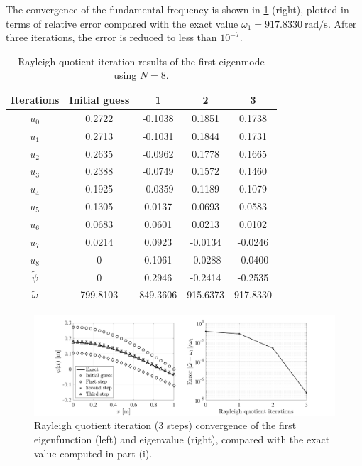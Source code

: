 \begin{enumerate}[(i)]
{    The convergence of the fundamental frequency is shown in \cref{fig:hw3_p5_results} (right), plotted in terms of relative error compared with the exact value $\omega_1 = \qty{917.8330}{\radian\per\second}$. 
    After three iterations, the error is reduced to less than $10^{-7}$.
    \begin{table}[!ht]
        \centering
        \begin{tabular}{|c|c|c|c|c|}
            \hline
            Iterations & Initial guess & 1 & 2 & 3 \\ \hline
            $u_0$ & 0.2722 & -0.1038 &  0.1851 &  0.1738 \\ \hline
            $u_1$ & 0.2713 & -0.1031 &  0.1844 &  0.1731 \\ \hline
            $u_2$ & 0.2635 & -0.0962 &  0.1778 &  0.1665 \\ \hline
            $u_3$ & 0.2388 & -0.0749 &  0.1572 &  0.1460 \\ \hline
            $u_4$ & 0.1925 & -0.0359 &  0.1189 &  0.1079 \\ \hline
            $u_5$ & 0.1305 &  0.0137 &  0.0693 &  0.0583 \\ \hline
            $u_6$ & 0.0683 &  0.0601 &  0.0213 &  0.0102 \\ \hline
            $u_7$ & 0.0214 &  0.0923 & -0.0134 & -0.0246 \\ \hline
            $u_8$ & 0      &  0.1061 & -0.0288 & -0.0400 \\ \hline
            $\tilde{\psi}$ &      0  &  0.2946 & -0.2414 & -0.2535 \\ \hline
            $\tilde{\omega}$ & 799.8103 & 849.3606 & 915.6373 & 917.8330
            \\ \hline
        \end{tabular}
        \caption{Rayleigh quotient iteration results of the  first eigenmode using $N = 8$. }
        \label{tab:hw3_p5_results}
    \end{table}
    \begin{figure}[!ht]
        \centering
        \includegraphics[width=\textwidth]{homework/hw3/assets/hw3_p5_results.pdf}
        \caption{Rayleigh quotient iteration (3 steps) convergence of the first eigenfunction (left) and eigenvalue (right), compared with the exact value computed in part (i). }
        \label{fig:hw3_p5_results}
    \end{figure}
    
}
\end{enumerate}

